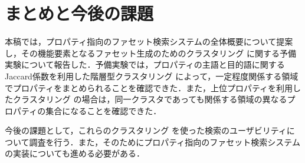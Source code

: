 \section{まとめと今後の課題}
本稿では，プロパティ指向のファセット検索システムの全体概要について提案し，その機能要素となるファセット生成のためのクラスタリング に関する予備実験について報告した．予備実験では，プロパティの主語と目的語に関するJaccard係数を利用した階層型クラスタリング によって，一定程度関係する領域でプロパティをまとめられることを確認できた．また，上位プロパティを利用したクラスタリング の場合は，同一クラスタであっても関係する領域の異なるプロパティの集合になることを確認できた．

今後の課題として，これらのクラスタリング を使った検索のユーザビリティについて調査を行う．また，そのためにプロパティ指向のファセット検索システムの実装についても進める必要がある．